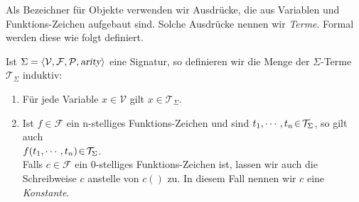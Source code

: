 \noindent
Als Bezeichner f\"{u}r Objekte verwenden wir Ausdr\"{u}cke, die aus Variablen und
Funktions-Zeichen aufgebaut sind.  Solche Ausdr\"{u}cke nennen wir \emph{Terme}.  
Formal werden diese wie folgt definiert.
\begin{Definition}
  Ist $\Sigma = \langle \mathcal{V}, \mathcal{F}, \mathcal{P}, \textsl{arity} \rangle$ eine Signatur, so definieren wir die Menge der $\Sigma$-Terme
  $\mathcal{T}_\Sigma$ induktiv:
  \begin{enumerate}
  \item F\"{u}r jede Variable $x \in \mathcal{V}$ gilt $x \in \mathcal{T}_\Sigma$.
  \item Ist $f \in \mathcal{F}$ ein n-stelliges Funktions-Zeichen und sind 
        $t_1,\cdots,t_n \!\in\! \mathcal{T}_\Sigma$, so gilt auch \\[0.2cm]
        \hspace*{1.3cm} $f(t_1,\cdots,t_n) \!\in\! \mathcal{T}_\Sigma$. \\[0.2cm]
        Falls $c \in \mathcal{F}$ ein 0-stelliges Funktions-Zeichen ist, lassen wir auch die Schreibweise
        $c$ anstelle von $c()$ zu.  In diesem Fall nennen wir $c$ eine \emph{Konstante}.
        \eox
  \end{enumerate}
\end{Definition}

